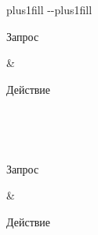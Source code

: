 \documentclass[letterpaper,10pt,russian]{sphinxmanual}
\begin{document}
\begin{savenotes}
\sphinxatlongtablestart
\sphinxthistablewithglobalstyle
\makeatletter
  \LTleft \@totalleftmargin plus1fill
  \LTright\dimexpr\columnwidth-\@totalleftmargin-\linewidth\relax plus1fill
\makeatother
\begin{longtable}{}
\sphinxtoprule
\begin{varwidth}[t]{}
\sphinxstyletheadfamily \sphinxAtStartPar
Запрос
\sphinxbeforeendvarwidth
\end{varwidth}%
&\begin{varwidth}[t]{}
\sphinxstyletheadfamily \sphinxAtStartPar
Действие
\sphinxbeforeendvarwidth
\end{varwidth}%
\\
\sphinxmidrule
\endfirsthead

\\
\sphinxtoprule
\begin{varwidth}[t]{}
\sphinxstyletheadfamily \sphinxAtStartPar
Запрос
\sphinxbeforeendvarwidth
\end{varwidth}%
&\begin{varwidth}[t]{}
\sphinxstyletheadfamily \sphinxAtStartPar
Действие
\sphinxbeforeendvarwidth
\end{varwidth}%
\\
\sphinxmidrule
\endhead

\sphinxbottomrule
{}\\
\endfoot


\end{longtable}
\end{savenotes}
\end{document}
